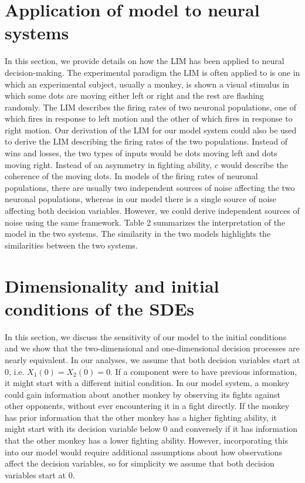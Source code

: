\documentclass{article}
\begin{document}
\section{Application of model to neural systems \label{neural} }
In this section, we provide details on how the LIM has been applied to neural decision-making. The experimental paradigm the LIM is often applied to is one in which an experimental subject, usually a monkey, is shown a visual stimulus in which some dots are moving either left or right and the rest are flashing randomly. The LIM describes the firing rates of two neuronal populations, one of which fires in response to left motion and the other of which fires in response to right motion. Our derivation of the LIM for our model system could also be used to derive the LIM describing the firing rates of the two populations. Instead of wins and losses, the two types of inputs would be dots moving left and dots moving right. Instead of an asymmetry in fighting ability, $c$ would describe the coherence of the moving dots. In models of the firing rates of neuronal populations, there are usually two independent sources of noise affecting the two neuronal populations, whereas in our model there is a single source of noise affecting both decision variables. However, we could derive  independent sources of noise using the same framework. Table 2 summarizes the interpretation of the model in the two systems. The similarity in the two models highlights the similarities between the two systems.



\section{Dimensionality and initial conditions of the SDEs \label{dimension_initconds} }
In this section, we discuss the sensitivity of our model to the initial conditions and we show that the two-dimensional and one-dimensional decision processes are nearly equivalent. 
In our analyses, we assume that both decision variables start at $0$, i.e. $X_1(0)=X_2(0)=0$.  If a component were to have previous information, it might start with a different initial condition. In our model system, a monkey could gain information about another monkey by observing its fights against other opponents, without ever encountering it in a fight directly.  If the monkey has prior information that the other monkey has a higher fighting ability, it might start with its decision variable below $0$ and conversely if it has information that the other monkey has a lower fighting ability.  However, incorporating this  into our model would require additional assumptions about how observations affect the decision variables, so for simplicity we assume that both decision variables start at $0$.
\end{document}
